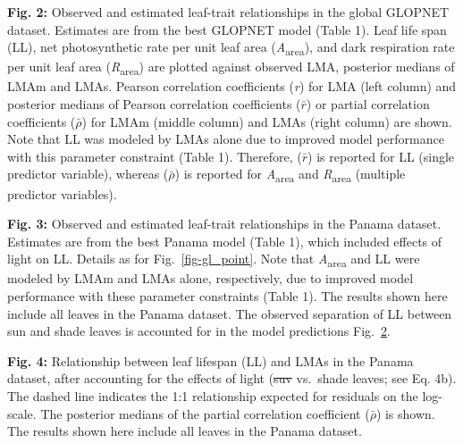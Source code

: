 \documentclass[
  12pt,
  letterpaper,
  DIV=11,
  numbers=noendperiod]{scrartcl}
\providecommand{\DIFadd}[1]{{\protect\color{blue}\uwave{#1}}} %
\providecommand{\DIFdel}[1]{{\protect\color{red}\sout{#1}}}                      %
\providecommand{\DIFaddbegin}{} %
\providecommand{\DIFaddend}{} %
\providecommand{\DIFdelbegin}{} %
\providecommand{\DIFdelend}{} %
\newcommand{\DIFscaledelfig}{0.5}
\newlength{\DIFdelgraphicswidth} %
\newlength{\DIFdelgraphicsheight} %
\newcommand{\DIFaddincludegraphics}[2][]{{\color{blue}\fbox{\DIFOincludegraphics[#1]{#2}}}} %
\newcommand{\DIFdelincludegraphics}[2][]{%
\sbox{\DIFdelgraphicsbox}{\DIFOincludegraphics[#1]{#2}}%
\settoboxwidth{\DIFdelgraphicswidth}{\DIFdelgraphicsbox} %
\settoboxtotalheight{\DIFdelgraphicsheight}{\DIFdelgraphicsbox} %
\scalebox{\DIFscaledelfig}{%
\parbox[b]{\DIFdelgraphicswidth}{\usebox{\DIFdelgraphicsbox}\\[-\baselineskip] \rule{\DIFdelgraphicswidth}{0em}}\llap{\resizebox{\DIFdelgraphicswidth}{\DIFdelgraphicsheight}{%
\setlength{\unitlength}{\DIFdelgraphicswidth}%
\begin{picture}(1,1)%
\thicklines\linethickness{2pt} %
{\color[rgb]{1,0,0}\put(0,0){\framebox(1,1){}}}%
{\color[rgb]{1,0,0}\put(0,0){\line( 1,1){1}}}%
{\color[rgb]{1,0,0}\put(0,1){\line(1,-1){1}}}%
\end{picture}%
}\hspace*{3pt}}} %
} %
\DeclareRobustCommand{\DIFaddbegin}{\DIFOaddbegin \let\includegraphics\DIFaddincludegraphics} %
\DeclareRobustCommand{\DIFaddend}{\DIFOaddend \let\includegraphics\DIFOincludegraphics} %
\DeclareRobustCommand{\DIFdelbegin}{\DIFOdelbegin \let\includegraphics\DIFdelincludegraphics} %
\DeclareRobustCommand{\DIFdelend}{\DIFOaddend \let\includegraphics\DIFOincludegraphics} %
\begin{document}
\textbf{Fig. 2:} Observed and estimated leaf-trait relationships in the
global GLOPNET dataset. Estimates are from the best GLOPNET model (Table
1). Leaf life span (LL), net photosynthetic rate per unit leaf area
(\emph{A}\textsubscript{area}), and dark respiration rate per unit leaf
area (\emph{R}\textsubscript{area}) are plotted against observed LMA,
posterior medians of LMAm and LMAs. Pearson correlation coefficients
(\emph{r}) for LMA (left column) and posterior medians of Pearson
correlation coefficients (\(\bar{r}\)) or partial correlation
coefficients (\(\bar{\rho}\)) for LMAm (middle column) and LMAs (right
column) are shown. Note that LL was modeled by LMAs alone due to
improved model performance with this parameter constraint (Table 1).
Therefore, (\(\bar{r}\)) is reported for LL (single predictor variable),
whereas (\(\bar{\rho}\)) is reported for \emph{A}\textsubscript{area}
and \emph{R}\textsubscript{area} (multiple predictor variables).

\begin{figure}

\centering{

}

\caption{\label{fig-pa_point}}

\end{figure}%

\textbf{Fig. 3:} Observed and estimated leaf-trait relationships in the
Panama dataset. Estimates are from the best Panama model (Table 1),
which included effects of light on LL. Details as for
Fig.~\ref{fig-gl_point}. Note that \emph{A}\textsubscript{area} and LL
were modeled by LMAm and LMAs alone, respectively, due to improved model
performance with these parameter constraints (Table 1). The results
shown here include all leaves in the Panama dataset. The observed
separation of LL between sun and shade leaves is accounted for in the
model predictions Fig.~\ref{fig-ll_point}.

\begin{figure}

\centering{

}

\caption{\label{fig-ll_point}}

\end{figure}%

\textbf{Fig. 4:} Relationship between leaf lifespan (LL) and LMAs in the
Panama dataset, after accounting for the effects of light (\DIFdelbegin \DIFdel{suv }\DIFdelend \DIFaddbegin \DIFadd{sun }\DIFaddend vs.~shade
leaves; see Eq. 4b). The dashed line indicates the 1:1 relationship
expected for residuals on the log-scale. The posterior medians of the
partial correlation coefficient (\(\bar{\rho}\)) is shown. The results
shown here include all leaves in the Panama dataset.
\end{document}
